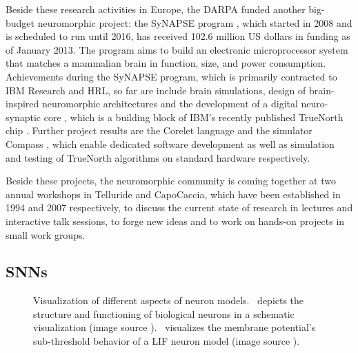 Beside these research activities in Europe, the \ac{DARPA} funded another big-budget neuromorphic project: the \ac{SyNAPSE} program \cite{SYNAPSE-proj, Srinivasa2012}, which started in 2008 and is scheduled to run until 2016, has received 102.6 million US dollars in funding as of January 2013.
The program aims to build an electronic microprocessor system that matches a mammalian brain in function, size, and power consumption.
Achievements during the \ac{SyNAPSE} program, which is primarily contracted to IBM Research and \acs{HRL}, so far are include brain simulations, design of brain-inspired neuromorphic architectures \cite{Nere2012} and the development of a digital neuro-synaptic core \cite{Merolla2011}, which is a building block of IBM's recently published TrueNorth chip \cite{Akopyan2015}.
Further project results are the Corelet language \cite{Amir2013} and the simulator Compass \cite{Preissl2012}, which enable dedicated software development as well as simulation and testing of TrueNorth algorithms on standard hardware respectively.

Beside these projects, the neuromorphic community is coming together at two annual  workshops in Telluride and CapoCaccia, which have been established in 1994 and 2007 respectively, to discuss the current state of research in lectures and interactive talk sessions, to forge new ideas and to work on hands-on projects in small work groups.

\subsection{\aclp{SNN}}
\label{subsec:SNN}
\begin{figure}[t!]
	\centering
    \caption{Visualization of different aspects of neuron models.~\protect{} depicts the structure and functioning of biological neurons in a schematic visualization (image source \cite{Gerstner2002}).~\protect{} visualizes the membrane potential's sub-threshold behavior of a \ac{LIF} neuron model (image source \cite{Masquelier2007}).}\label{fig:neuron_models}
\end{figure}

